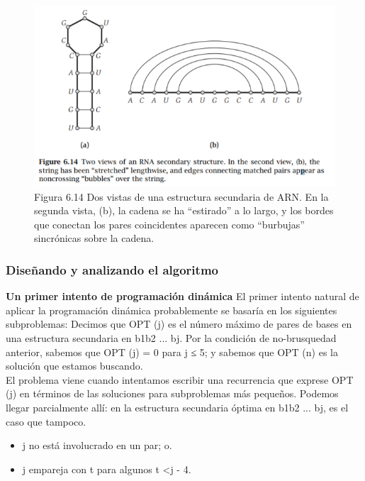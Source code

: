 \documentclass[a4paper, 12pt]{book}
\theoremstyle{dotless}
\begin{document}
\begin{figure}[h]
\centering
\includegraphics[scale=1]{Imagenes-Seccion6/fig6_14.PNG}
\caption{Figura 6.14 Dos vistas de una estructura secundaria de ARN. En la segunda vista, (b), la cadena se ha ``estirado'' a lo largo, y los bordes que conectan los pares coincidentes aparecen como ``burbujas'' sincrónicas sobre la cadena.}
\end{figure}

\subsubsection*{Diseñando y analizando el algoritmo}

\textbf{Un primer intento de programación dinámica} El primer intento natural de aplicar la programación dinámica probablemente se basaría en los siguientes subproblemas: Decimos que OPT (j) es el número máximo de pares de bases en una estructura secundaria en b1b2 ... bj. Por la condición de no-brusquedad anterior, sabemos que OPT (j) = 0 para j ≤ 5; y sabemos que OPT (n) es la solución que estamos buscando.\\

El problema viene cuando intentamos escribir una recurrencia que exprese OPT (j) en términos de las soluciones para subproblemas más pequeños. Podemos llegar parcialmente allí: en la estructura secundaria óptima en b1b2 ... bj, es el caso que tampoco.\\

\begin{itemize}
    \item j no está involucrado en un par; o.
    \item j empareja con t para algunos t <j - 4.
\end{itemize}
\end{document}
